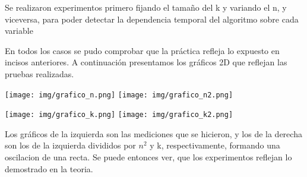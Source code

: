 Se realizaron experimentos primero fijando el tamaño del k y variando el n, y viceversa, para poder detectar la dependencia temporal del algoritmo sobre cada variable

En todos los casos se pudo comprobar que la práctica refleja lo expuesto en incisos anteriores. A continuación presentamos los gráficos 2D que reflejan las pruebas realizadas. 

\bigskip
\noindent \texttt{[image: img/grafico\_n.png]}
\noindent \texttt{[image: img/grafico\_n2.png]}

\bigskip
\noindent \texttt{[image: img/grafico\_k.png]}
\noindent \texttt{[image: img/grafico\_k2.png]}

\bigskip
Los gráficos de la izquierda son las mediciones que se hicieron, y los de la derecha son los de la izquierda divididos por $n^2$ y k, respectivamente, formando una oscilacion de una recta. Se puede entonces ver, que los experimentos reflejan lo demostrado en la teoria.